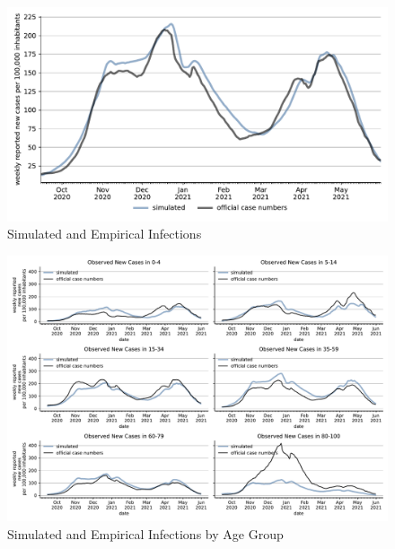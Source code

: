 \begin{figure}[ht]
\centering
  \includegraphics[width=\textwidth]{../figures/results/figures/scenario_comparisons/combined_fit/full_new_known_case}
\caption{Simulated and Empirical Infections}
\label{fig:aggregated_fit2}
\end{figure}



\begin{figure}[ht]
\centering
  \includegraphics[width=\textwidth]{../figures/results/figures/incidences_by_group/age_group_rki/full_combined_baseline_new_known_case}
\caption{Simulated and Empirical Infections by Age Group}
\label{fig:age_group_fit}
\end{figure}


